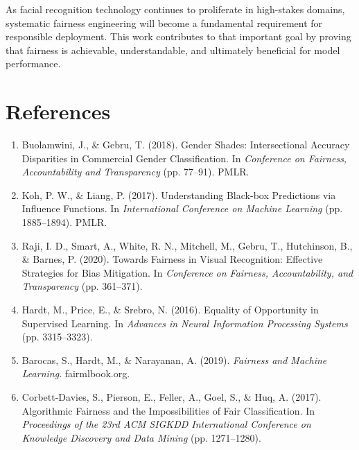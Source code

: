 \documentclass[11pt,a4paper,oneside]{report}
\begin{document}
As facial recognition technology continues to proliferate in high-stakes domains, systematic fairness engineering will become a fundamental requirement for responsible deployment. This work contributes to that important goal by proving that fairness is achievable, understandable, and ultimately beneficial for model performance.

\newpage


\chapter*{References}

\begin{enumerate}

\item Buolamwini, J., \& Gebru, T. (2018). Gender Shades: Intersectional Accuracy Disparities in Commercial Gender Classification. In \textit{Conference on Fairness, Accountability and Transparency} (pp. 77--91). PMLR.

\item Koh, P. W., \& Liang, P. (2017). Understanding Black-box Predictions via Influence Functions. In \textit{International Conference on Machine Learning} (pp. 1885--1894). PMLR.

\item Raji, I. D., Smart, A., White, R. N., Mitchell, M., Gebru, T., Hutchinson, B., \& Barnes, P. (2020). Towards Fairness in Visual Recognition: Effective Strategies for Bias Mitigation. In \textit{Conference on Fairness, Accountability, and Transparency} (pp. 361--371).

\item Hardt, M., Price, E., \& Srebro, N. (2016). Equality of Opportunity in Supervised Learning. In \textit{Advances in Neural Information Processing Systems} (pp. 3315--3323).

\item Barocas, S., Hardt, M., \& Narayanan, A. (2019). \textit{Fairness and Machine Learning}. fairmlbook.org.

\item Corbett-Davies, S., Pierson, E., Feller, A., Goel, S., \& Huq, A. (2017). Algorithmic Fairness and the Impossibilities of Fair Classification. In \textit{Proceedings of the 23rd ACM SIGKDD International Conference on Knowledge Discovery and Data Mining} (pp. 1271--1280).


\end{enumerate}
\end{document}
